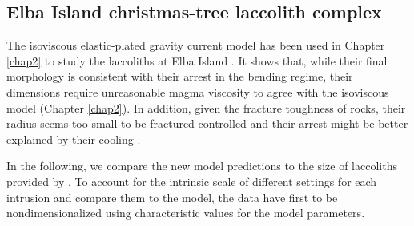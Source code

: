 \subsection{Elba Island christmas-tree laccolith complex}
\label{C4-sec:appl-arrest-terr}

The isoviscous elastic-plated  gravity current model has  been used in
Chapter   \ref{chap2}  to   study  the   laccoliths  at   Elba  Island
\citep{Michaut:2011kg}. It shows that, while their final morphology is
consistent with their  arrest in the bending  regime, their dimensions
require  unreasonable magma  viscosity  to agree  with the  isoviscous
model  (Chapter   \ref{chap2}).   In  addition,  given   the  fracture
toughness  of rocks,  their  radius  seems too  small  to be  fractured
controlled and their arrest might be better explained by their cooling
\citep{Michaut:2011kg}.

In the following, we compare the  new model predictions to the size of
laccoliths  provided by  \citet{Rocchi:2002jy}.   To  account for  the
intrinsic scale of  different settings for each  intrusion and compare
them to the model, the data  have first to be nondimensionalized using
characteristic values for the model parameters.

